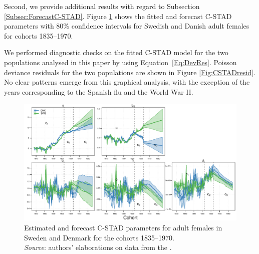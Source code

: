 \documentclass[11pt, a4paper]{article}
\begin{document}
Second, we provide additional results with regard to Subsection \ref{Subsec:ForecastC-STAD}. Figure \ref{Fig:CSTADparams} shows the fitted and forecast C-STAD parameters with 80\% confidence intervals for Swedish and Danish adult females for cohorts 1835--1970.

We performed diagnostic checks on the fitted C-STAD model for the two populations analysed in this paper by using Equation~\eqref{Eq:DevRes}. Poisson deviance residuals for the two populations are shown in Figure \ref{Fig:CSTADresid}. No clear patterns emerge from this graphical analysis, with the exception of the years corresponding to the Spanish flu and the World War II.

\begin{landscape}
	\begin{figure}[h!]
		\begin{center}
			\includegraphics[scale=0.92]{./Figures/FA1.pdf} 
			\caption{Estimated and forecast C-STAD parameters for adult females in Sweden and Denmark for the cohorts 1835--1970. \\ \small \textit{Source}: authors' elaborations on data from the \cite{HMD}.\label{Fig:CSTADparams}}    
		\end{center}
	\end{figure}
\end{landscape}
 
\end{document}
